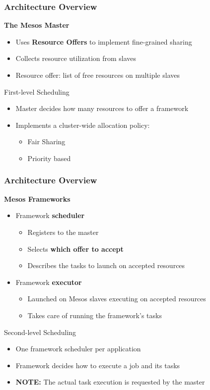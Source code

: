 \begin{frame}
\frametitle{Architecture Overview}
{\bf The Mesos Master}
\begin{itemize}
	\item Uses {\bf Resource Offers} to implement fine-grained sharing
	\item Collects resource utilization from slaves
	\item Resource offer: list of free resources on multiple slaves
\end{itemize}

\vspace{20pt}

\begin{block}{First-level Scheduling}
\begin{itemize}
	\item Master decides how many resources to offer a framework
	\item Implements a cluster-wide allocation policy:
	\begin{itemize}
		\item Fair Sharing
		\item Priority based
	\end{itemize}
\end{itemize}
\end{block}
\end{frame}

\begin{frame}
\frametitle{Architecture Overview}
{\bf Mesos Frameworks}
\begin{itemize}
	\item Framework {\bf scheduler}
	\begin{itemize}
		\item Registers to the master
		\item Selects {\bf which offer to accept}
		\item Describes the tasks to launch on accepted resources
	\end{itemize}	
	\item Framework {\bf executor}
	\begin{itemize}
		\item Launched on Mesos slaves executing on accepted resources
		\item Takes care of running the framework's tasks
	\end{itemize}
\end{itemize}
\begin{block}{Second-level Scheduling}
\begin{itemize}
	\item One framework scheduler per application
	\item Framework decides how to execute a job and its tasks
	\item {\bf NOTE:} The actual task execution is requested by the master
\end{itemize}
\end{block}
\end{frame}


